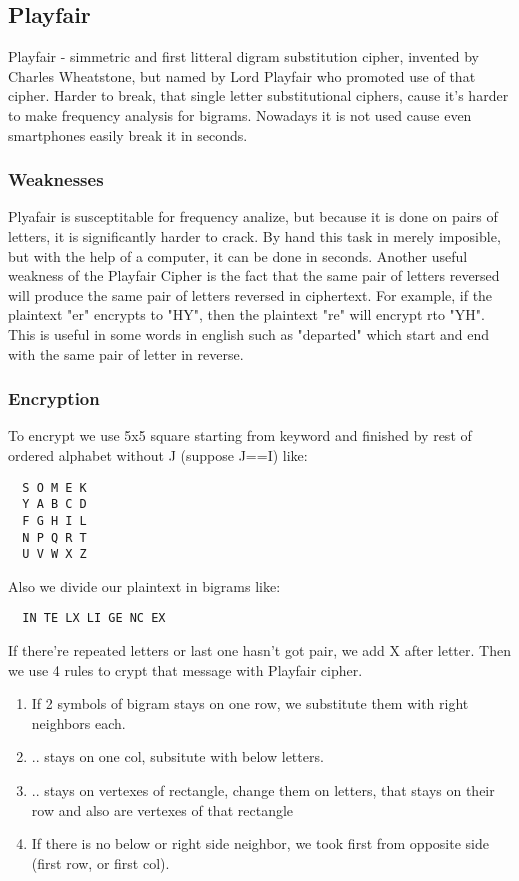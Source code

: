 \documentclass[10pt]{article}
\begin{document}
  \subsection{Playfair}
  Playfair - simmetric and first litteral digram substitution cipher, invented by Charles Wheatstone, but named by Lord Playfair who promoted use of that cipher. Harder to break, that single letter substitutional ciphers, cause it's harder to make frequency analysis for bigrams. Nowadays it is not used cause even smartphones easily break it in seconds.
  \subsubsection{Weaknesses}
  Plyafair is susceptitable for frequency analize, but because it is done on pairs of letters, it is significantly harder to crack. By hand this task in merely imposible, but with the help of a computer, it can be done in seconds.
  Another useful weakness of the Playfair Cipher is the fact that the same pair of letters reversed will produce the same pair of letters reversed in ciphertext. For example, if the plaintext "er" encrypts to "HY", then the plaintext "re" will encrypt rto "YH". This is useful in some words in english such as "departed" which start and end with the same pair of letter in reverse.
  \subsubsection{Encryption}
  To encrypt we use 5x5 square starting from keyword and finished by rest of ordered alphabet without J (suppose J==I) like:
  \begin{verbatim}  
  S O M E K
  Y A B C D
  F G H I L
  N P Q R T
  U V W X Z
  \end{verbatim}
  Also we divide our plaintext in bigrams like:
  \begin{verbatim}
  IN TE LX LI GE NC EX
  \end{verbatim}
  If there're repeated letters or last one hasn't got pair, we add X after letter.
  Then we use 4 rules to crypt that message with Playfair cipher.
  \begin{enumerate}
  	\item If 2 symbols of bigram stays on one row, we substitute them with right neighbors each.
  	\item .. stays on one col, subsitute with below letters.
  	\item .. stays on vertexes of rectangle, change them on letters, that stays on their row and also are vertexes of that rectangle
  	\item If there is no below or right side neighbor, we took first from opposite side (first row, or first col). 
  \end{enumerate}
\end{document}
